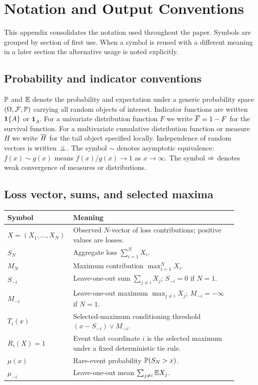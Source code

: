 \section{Notation and Output Conventions}
\label{appx:notation}

This appendix consolidates the notation used throughout the paper. Symbols are
grouped by section of first use. When a symbol is reused with a different
meaning in a later section the alternative usage is noted explicitly.

\subsection{Probability and indicator conventions}

\(\mathbb{P}\) and \(\mathbb{E}\) denote the probability and expectation under a generic
probability space \((\Omega,\mathcal{F},\mathbb{P})\) carrying all random objects of
interest. Indicator functions are written \(\mathbf{1}\{A\}\) or \(\mathbf{1}_A\). For
a univariate distribution function \(F\) we write \(\overline{F}=1-F\) for the survival
function. For a multivariate cumulative distribution function or measure
\(H\) we write \(\overline{H}\) for the tail object specified locally. Independence of
random vectors is written \(\perp\!\!\!\perp\). The symbol \(\sim\) denotes asymptotic
equivalence: \(f(x)\sim g(x)\) means \(f(x)/g(x)\to 1\) as \(x\to\infty\).
The symbol \(\Rightarrow\) denotes weak convergence of measures or distributions.

\subsection{Loss vector, sums, and selected maxima}

\begin{longtable}{p{0.22\linewidth}p{0.70\linewidth}}
\toprule
Symbol & Meaning \\
\midrule
\endhead
\(X=(X_1,\ldots,X_N)\) & Observed \(N\)-vector of loss contributions; positive values are losses. \\
\(S_N\) & Aggregate loss \(\sum_{i=1}^N X_i\). \\
\(M_N\) & Maximum contribution \(\max_{i=1}^N X_i\). \\
\(S_{-i}\) & Leave-one-out sum \(\sum_{j\ne i}X_j\); \(S_{-i}=0\) if \(N=1\). \\
\(M_{-i}\) & Leave-one-out maximum \(\max_{j\ne i}X_j\); \(M_{-i}=-\infty\) if \(N=1\). \\
\(T_i(x)\) & Selected-maximum conditioning threshold \((x-S_{-i})\vee M_{-i}\). \\
\(R_i(X)=1\) & Event that coordinate \(i\) is the selected maximum under a fixed deterministic tie rule. \\
\(\mu(x)\) & Rare-event probability \(\mathbb{P}(S_N>x)\). \\
\(\mu_{-i}\) & Leave-one-out mean \(\sum_{j\ne i}\mathbb{E} X_j\). \\
\bottomrule
\end{longtable}

